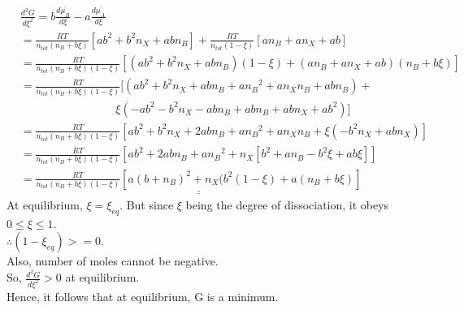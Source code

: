 \documentclass[a4paper,fleqn]{article}
\begin{document}
	\begin{equation*}
	\begin{split}
	&\frac{d^2G}{d\xi^2} =	b \frac{d \overline{\mu_B}}{d\xi} - a \frac{d\overline{\mu_A}}{d\xi}\\
	&= \frac{RT}{n_{tot}(n_B + b\xi)} \left[ ab^2 + b^2n_X + abn_B \right] + \frac{RT}{n_{tot}(1-\xi)} \left[ an_B + an_X + ab \right]\\
	&= \frac{RT}{n_{tot}(n_B + b\xi)(1 - \xi)} \left[ (ab^2 + b^2n_X + abn_B)(1 - \xi) + (an_B + an_X + ab)(n_B + b\xi) \right]\\
	&= \frac{RT}{n_{tot}(n_B + b\xi)(1 - \xi)} [ (ab^2 + b^2n_X + abn_B + a{n_B}^2 + an_X n_B + abn_B) +\\
	 &~~~~~~~~~~~~~~~~~~~~~~~~~~~~~~~~~~~~~~\xi( -ab^2 - b^2n_X - abn_B + abn_B + abn_X + ab^2 )]\\
	&= \frac{RT}{n_{tot}(n_B + b\xi)(1 - \xi)} \left[ ab^2 + b^2 n_X + 2abn_B + a{n_B}^2 + an_X n_B + \xi(-b^2 n_X + ab n_X) \right]\\
	&= \frac{RT}{n_{tot}(n_B + b\xi)(1 - \xi)} \left[ ab^2 + 2abn_B + a{n_B}^2 + n_X\left[ b^2 + an_B - b^2\xi + ab\xi \right] \right]\\
	&= \underline{\underline{\frac{RT}{n_{tot}(n_B + b\xi)(1 - \xi)} \left[ a(b + n_B)^2 + n_X (b^2 (1 - \xi) + a(n_B + b\xi) \right]}}
	\end{split}	
	\end{equation*}
	At equilibrium, $\xi = \xi_{eq}$. But since $\xi$ being the degree of dissociation, it obeys $0 \leq \xi \leq 1$.\\
	 $\therefore ( 1 - \xi_{eq}) >= 0$.\\
	 Also, number of moles cannot be negative.\\
	So, $\frac{d^2G}{d\xi^2} > 0$ at equilibrium.\\
	Hence, it follows that at equilibrium, G is a minimum.
	\newpage
\end{document}

